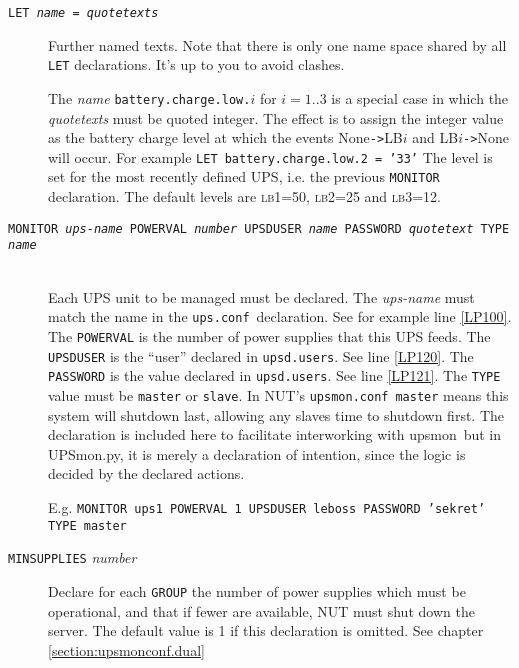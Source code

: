 \documentclass[12pt]{article}
\newcommand{\upsmon}{\mbox{\textcolor{MONCOLOUR}{upsmon}}}
\newcommand{\UPSmon}{\mbox{\textcolor{UPSMONCOLOUR}{UPSmon.py}}}
\newcommand{\LBi}{\textcolor{MONCOLOUR}{\textsc{lb1}}}
\newcommand{\LBii}{\textcolor{MONCOLOUR}{\textsc{lb2}}}
\newcommand{\LBiii}{\textcolor{MONCOLOUR}{\textsc{lb3}}}
\newcommand{\EVENT}[2]{\textcolor{MONCOLOUR}{#1}{\allowbreak}\texttt{\textcolor{MONCOLOUR}{->}}{\allowbreak}\textcolor{MONCOLOUR}{#2}}
\newcommand{\upsconf}{\textcolor{UPSDCOLOUR}{\texttt{ups.conf}}}
\newcommand{\upsdusers}{\textcolor{UPSDCOLOUR}{\texttt{upsd.users}}}
\newcommand{\upsmonconf}{\textcolor{MONCOLOUR}{\texttt{upsmon.conf}}}
\newcommand{\Ref}[1]{\ref{#1}}
\begin{document}
\begin{description}

\item[\texttt{LET \textit{name} = \textit{quotetexts}}] \hspace{7mm} Further
  named texts.  Note that there is only one name space shared by all
  \texttt{LET} declarations.  It's up to you to avoid clashes.

  The \textit{name} \texttt{battery.charge.low.}$i$ for $i = 1..3$ is a
  special case in which the \textit{quotetexts} must be quoted integer.  The
  effect is to assign the integer value as the battery charge level at which
  the events \EVENT{None}{LB$i$} and \EVENT{LB$i$}{None} will occur.  For
  example \texttt{LET battery.charge.low.2 = '33'} The level is set for the
  most recently defined UPS, i.e. the previous \texttt{MONITOR} declaration.
  The default levels are \LBi=50, \LBii=25 and \LBiii=12.

\item[\texttt{MONITOR \textit{ups-name} POWERVAL \textit{number} UPSDUSER
    \textit{name} PASSWORD \textit{quotetext} TYPE
    \textit{name}}] \ \\
  Each UPS unit to be managed must be declared.
  The \textit{ups-name} must match the name in the \upsconf\ declaration.
  See for example line \Ref{LP100}.  The \texttt{POWERVAL} is the number of
  power supplies that this UPS feeds.  The \texttt{UPSDUSER} is the ``user''
  declared in \upsdusers.  See line \Ref{LP120}.  The \texttt{PASSWORD} is the
  value declared in \upsdusers.  See line \Ref{LP121}.  The \texttt{TYPE}
  value must be \texttt{master} or \texttt{slave}.  In NUT's
  \upsmonconf\ \texttt{master} means this system will shutdown last, allowing
  any slaves time to shutdown first.  The declaration is included here to
  facilitate interworking with \upsmon\ but in \UPSmon, it is merely a
  declaration of intention, since the logic is decided by the declared
  actions.

  E.g. \texttt{MONITOR ups1 POWERVAL 1 UPSDUSER leboss PASSWORD 'sekret' TYPE master}

\item[\texttt{MINSUPPLIES} \textit{number}] \hspace{7mm} 

Declare for each \texttt{GROUP} the number of power supplies which must be
operational, and that if fewer are available, NUT must shut down the server.
The default value is 1 if this declaration is omitted.  See chapter
\ref{section:upsmonconf.dual}


\end{description}
\end{document}
